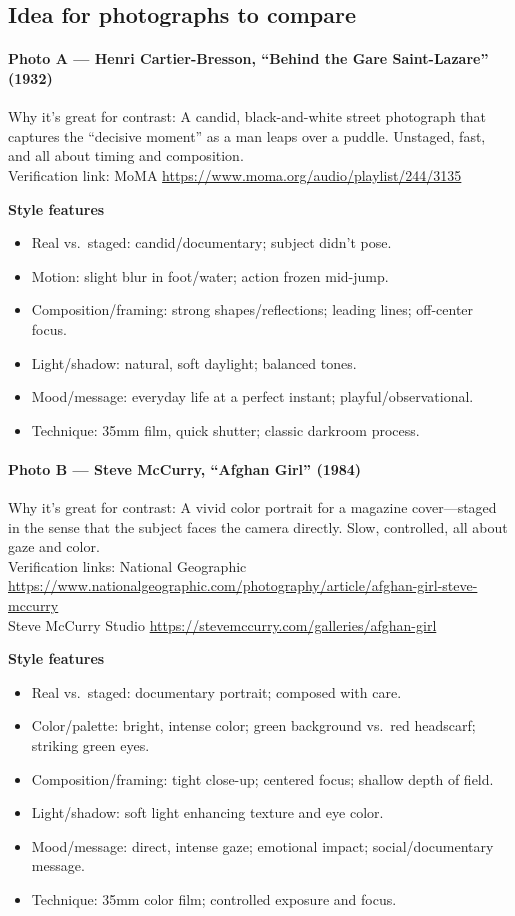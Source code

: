 \documentclass[12pt]{article}
\begin{document}
\subsection*{Idea for photographs to compare}

\paragraph{Photo A — Henri Cartier-Bresson, ``Behind the Gare Saint-Lazare'' (1932)}
Why it’s great for contrast: A candid, black-and-white street photograph that captures the ``decisive moment'' as a man leaps over a puddle. Unstaged, fast, and all about timing and composition. \\
Verification link: MoMA \url{https://www.moma.org/audio/playlist/244/3135}

\textbf{Style features}
\begin{itemize}
  \item Real vs.\ staged: candid/documentary; subject didn’t pose.
  \item Motion: slight blur in foot/water; action frozen mid-jump.
  \item Composition/framing: strong shapes/reflections; leading lines; off-center focus.
  \item Light/shadow: natural, soft daylight; balanced tones.
  \item Mood/message: everyday life at a perfect instant; playful/observational.
  \item Technique: 35mm film, quick shutter; classic darkroom process.
\end{itemize}


\paragraph{Photo B — Steve McCurry, ``Afghan Girl'' (1984)}
Why it’s great for contrast: A vivid color portrait for a magazine cover—staged in the sense that the subject faces the camera directly. Slow, controlled, all about gaze and color. \\
Verification links: National Geographic \url{https://www.nationalgeographic.com/photography/article/afghan-girl-steve-mccurry} \\
Steve McCurry Studio \url{https://stevemccurry.com/galleries/afghan-girl}

\textbf{Style features}
\begin{itemize}
  \item Real vs.\ staged: documentary portrait; composed with care.
  \item Color/palette: bright, intense color; green background vs.\ red headscarf; striking green eyes.
  \item Composition/framing: tight close-up; centered focus; shallow depth of field.
  \item Light/shadow: soft light enhancing texture and eye color.
  \item Mood/message: direct, intense gaze; emotional impact; social/documentary message.
  \item Technique: 35mm color film; controlled exposure and focus.
\end{itemize}
\end{document}
